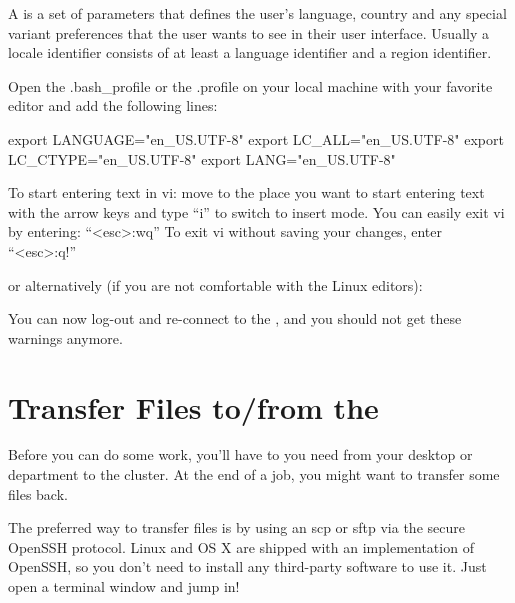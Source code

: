 A  is a set of parameters that defines the user's language,
country and any special variant preferences that the user wants to see in their
user interface. Usually a locale identifier consists of at least a language
identifier and a region identifier.

Open the .bash\_profile or the .profile on your local machine with your
favorite editor and add the following lines:

\begin{prompt}
export LANGUAGE="en_US.UTF-8"
export LC_ALL="en_US.UTF-8"
export LC_CTYPE="en_US.UTF-8"
export LANG="en_US.UTF-8"
\end{prompt}

\begin{tip}[vi]
To start entering text in vi: move to the place you want to start entering text
with the arrow keys and type ``i'' to switch to insert mode.  You can easily
exit vi by entering: ``<esc>:wq''
To exit vi without saving your changes, enter ``<esc>:q!''
\end{tip}

or alternatively (if you are not comfortable with the Linux editors):

\begin{prompt}
\end{prompt}

You can now log-out and re-connect to the \hpc, and you should not get these
warnings anymore.

\section{Transfer Files to/from the \hpc}

Before you can do some work, you'll have to 
you need from your desktop or department to the cluster. At the end of a job,
you might want to transfer some files back.

\ifmacORlinux
The preferred way to transfer files is by using an scp or sftp via the secure
OpenSSH protocol.  Linux and OS X are shipped with an implementation of
OpenSSH, so you don't need to install any third-party software to use it. Just
open a terminal window and jump in!
\fi

